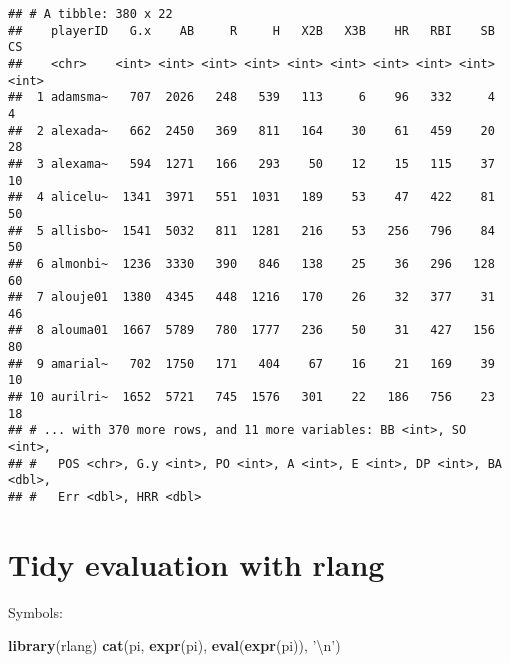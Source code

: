 \documentclass[]{book}
\newenvironment{Shaded}{\begin{snugshade}}{\end{snugshade}}
\newcommand{\KeywordTok}[1]{\textcolor[rgb]{0.13,0.29,0.53}{\textbf{#1}}}
\newcommand{\DecValTok}[1]{\textcolor[rgb]{0.00,0.00,0.81}{#1}}
\newcommand{\CharTok}[1]{\textcolor[rgb]{0.31,0.60,0.02}{#1}}
\newcommand{\StringTok}[1]{\textcolor[rgb]{0.31,0.60,0.02}{#1}}
\newcommand{\CommentTok}[1]{\textcolor[rgb]{0.56,0.35,0.01}{\textit{#1}}}
\newcommand{\OtherTok}[1]{\textcolor[rgb]{0.56,0.35,0.01}{#1}}
\newcommand{\ControlFlowTok}[1]{\textcolor[rgb]{0.13,0.29,0.53}{\textbf{#1}}}
\newcommand{\OperatorTok}[1]{\textcolor[rgb]{0.81,0.36,0.00}{\textbf{#1}}}
\newcommand{\NormalTok}[1]{#1}
\begin{document}
\begin{Shaded}
\end{Shaded}

\begin{verbatim}
## # A tibble: 380 x 22
##    playerID   G.x    AB     R     H   X2B   X3B    HR   RBI    SB    CS
##    <chr>    <int> <int> <int> <int> <int> <int> <int> <int> <int> <int>
##  1 adamsma~   707  2026   248   539   113     6    96   332     4     4
##  2 alexada~   662  2450   369   811   164    30    61   459    20    28
##  3 alexama~   594  1271   166   293    50    12    15   115    37    10
##  4 alicelu~  1341  3971   551  1031   189    53    47   422    81    50
##  5 allisbo~  1541  5032   811  1281   216    53   256   796    84    50
##  6 almonbi~  1236  3330   390   846   138    25    36   296   128    60
##  7 alouje01  1380  4345   448  1216   170    26    32   377    31    46
##  8 alouma01  1667  5789   780  1777   236    50    31   427   156    80
##  9 amarial~   702  1750   171   404    67    16    21   169    39    10
## 10 aurilri~  1652  5721   745  1576   301    22   186   756    23    18
## # ... with 370 more rows, and 11 more variables: BB <int>, SO <int>,
## #   POS <chr>, G.y <int>, PO <int>, A <int>, E <int>, DP <int>, BA <dbl>,
## #   Err <dbl>, HRR <dbl>
\end{verbatim}

\section{Tidy evaluation with rlang}\label{tidy-evaluation-with-rlang}

Symbols:

\begin{Shaded}
\begin{Highlighting}[]
\KeywordTok{library}\NormalTok{(rlang)}
\KeywordTok{cat}\NormalTok{(pi, }\KeywordTok{expr}\NormalTok{(pi), }\KeywordTok{eval}\NormalTok{(}\KeywordTok{expr}\NormalTok{(pi)), }\StringTok{'}\CharTok{\textbackslash{}n}\StringTok{'}\NormalTok{)}
\end{Highlighting}
\end{Shaded}
\end{document}
